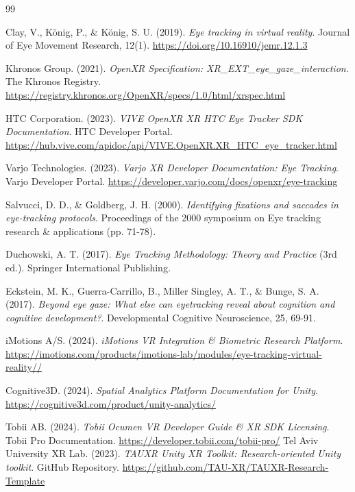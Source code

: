\documentclass[12pt,a4paper]{article}
\begin{document}
\newpage
\begin{thebibliography}{99}

    Clay, V., König, P., \& König, S. U. (2019).
    \textit{Eye tracking in virtual reality}.
    Journal of Eye Movement Research, 12(1). \url{https://doi.org/10.16910/jemr.12.1.3}

    Khronos Group. (2021).
    \textit{OpenXR Specification: XR\_EXT\_eye\_gaze\_interaction}.
    The Khronos Registry. \url{https://registry.khronos.org/OpenXR/specs/1.0/html/xrspec.html}

    HTC Corporation. (2023).
    \textit{VIVE OpenXR XR HTC Eye Tracker SDK Documentation}.
    HTC Developer Portal. \url{https://hub.vive.com/apidoc/api/VIVE.OpenXR.XR_HTC_eye_tracker.html}

    Varjo Technologies. (2023).
    \textit{Varjo XR Developer Documentation: Eye Tracking}.
    Varjo Developer Portal. \url{https://developer.varjo.com/docs/openxr/eye-tracking}

    Salvucci, D. D., \& Goldberg, J. H. (2000).
    \textit{Identifying fixations and saccades in eye-tracking protocols}.
    Proceedings of the 2000 symposium on Eye tracking research \& applications (pp. 71-78).

    Duchowski, A. T. (2017).
    \textit{Eye Tracking Methodology: Theory and Practice} (3rd ed.).
    Springer International Publishing.

    Eckstein, M. K., Guerra-Carrillo, B., Miller Singley, A. T., \& Bunge, S. A. (2017).
    \textit{Beyond eye gaze: What else can eyetracking reveal about cognition and cognitive development?}.
    Developmental Cognitive Neuroscience, 25, 69-91.

    iMotions A/S. (2024).
    \textit{iMotions VR Integration \& Biometric Research Platform}.
    \url{https://imotions.com/products/imotions-lab/modules/eye-tracking-virtual-reality//}

    Cognitive3D. (2024).
    \textit{Spatial Analytics Platform Documentation for Unity}.
    \url{https://cognitive3d.com/product/unity-analytics/}

    Tobii AB. (2024).
    \textit{Tobii Ocumen VR Developer Guide \& XR SDK Licensing}.
    Tobii Pro Documentation. \url{https://developer.tobii.com/tobii-pro/}
    Tel Aviv University XR Lab. (2023).
    \textit{TAUXR Unity XR Toolkit: Research-oriented Unity toolkit}.
    GitHub Repository. \url{https://github.com/TAU-XR/TAUXR-Research-Template}


\end{thebibliography}
\end{document}
